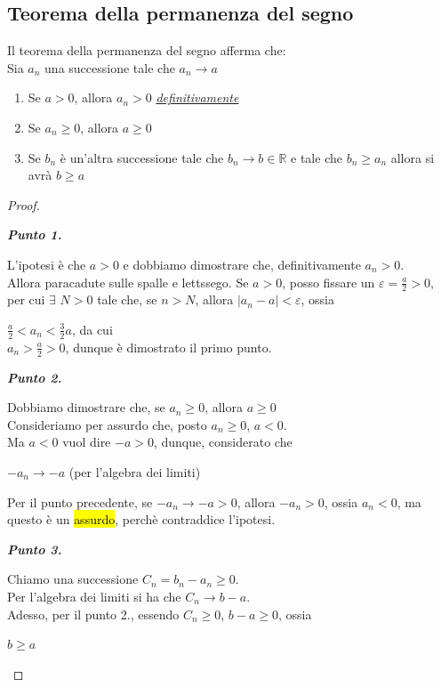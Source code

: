 \documentclass{article}
\theoremstyle{definition}
\begin{document}
\subsection{Teorema della permanenza del segno}
Il teorema della permanenza del segno afferma che:
\\
Sia $a_n$ una successione tale che $a_n \longrightarrow a$
\begin{enumerate}
    \item Se $a >0$, allora $a_n > 0$ \textit{\underline{definitivamente}}
    \item Se $a_n \geqslant 0$, allora $a \geqslant 0$
    \item Se $b_n$ è un'altra successione tale che $b_n \longrightarrow b \in \mathbb{R}$ e tale che $b_n \geqslant a_n$ allora si avrà $b \geqslant a$
\end{enumerate}
\begin{proof}
\begin{center}
    \textbf{\textit{Punto 1.}}
\end{center}
L'ipotesi è che $a>0$ e dobbiamo dimostrare che, definitivamente $a_n>0$.
\\
Allora paracadute sulle spalle e lettssego.
Se $a>0$, posso fissare un $\varepsilon=\frac{a}{2}>0$, per cui $\exists$ $N>0$ tale che, se $n>N$, allora $|a_n-a|<\varepsilon$, ossia
\begin{center}
    $\frac{a}{2}<a_n<\frac{3}{2}a$, da cui
    \\
    $a_n>\frac{a}{2}>0$, dunque è dimostrato il primo punto.
\end{center}
    \begin{center}
        \textbf{\textit{Punto 2.}}
    \end{center}
    Dobbiamo dimostrare che, se $a_n \geqslant 0$, allora $a \geqslant 0$
\\
Consideriamo per assurdo che, posto $a_n \geqslant 0$, $a <0$.
\\
Ma $a<0$ vuol dire $-a>0$, dunque, considerato che
\begin{center}
    $-a_n \longrightarrow -a$ (per l'algebra dei limiti)
\end{center}
Per il punto precedente, se $-a_n \longrightarrow -a >0$, allora $-a_n>0$, ossia $a_n <0$, ma questo è un \hl{assurdo}, perchè contraddice l'ipotesi.
\begin{center}
    \textbf{\textit{Punto 3.}}
\end{center}
Chiamo una successione $C_n=b_n-a_n \geqslant 0$.
\\
Per l'algebra dei limiti si ha che $C_n \longrightarrow b-a$.
\\
Adesso, per il punto 2., essendo $C_n \geqslant 0$, $b-a \geqslant 0$, ossia
\begin{center}
    $b \geqslant a$
\end{center}
\end{proof}
\end{document}

